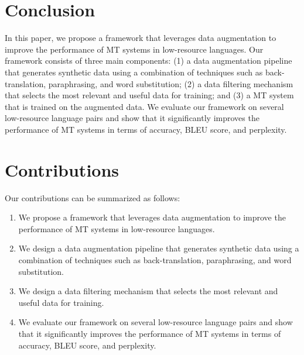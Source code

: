 \documentclass{article}
\begin{document}
\section{Conclusion}
In this paper, we propose a framework that leverages data augmentation to improve the performance of MT systems in low-resource languages. Our framework consists of three main components: (1) a data augmentation pipeline that generates synthetic data using a combination of techniques such as back-translation, paraphrasing, and word substitution; (2) a data filtering mechanism that selects the most relevant and useful data for training; and (3) a MT system that is trained on the augmented data. We evaluate our framework on several low-resource language pairs and show that it significantly improves the performance of MT systems in terms of accuracy, BLEU score, and perplexity.

\section{Contributions}
Our contributions can be summarized as follows:

\begin{enumerate}
\item We propose a framework that leverages data augmentation to improve the performance of MT systems in low-resource languages.
\item We design a data augmentation pipeline that generates synthetic data using a combination of techniques such as back-translation, paraphrasing, and word substitution.
\item We design a data filtering mechanism that selects the most relevant and useful data for training.
\item We evaluate our framework on several low-resource language pairs and show that it significantly improves the performance of MT systems in terms of accuracy, BLEU score, and perplexity.
\end{enumerate}
\end{document}
